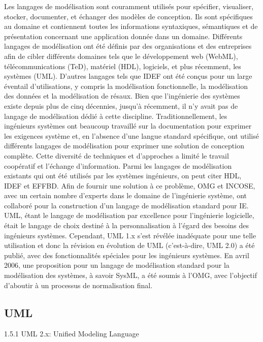 \documentclass[french]{spimufcphdthesis}
\begin{document}
Les langages de modélisation sont couramment utilisés pour spécifier, visualiser, stocker, documenter, et échanger des modèles de conception. Ils sont spécifiques au domaine et contiennent toutes les informations syntaxiques, sémantiques et de présentation concernant une application donnée dans un domaine. Différents langages de modélisation ont été définis par des organisations et des entreprises afin de cibler différents domaines tels que le développement web (WebML), télécommunications (TeD), matériel (HDL), logiciels, et plus récemment, les systèmes (UML). D'autres langages tels que IDEF ont été conçus pour un large éventail d'utilisations, y compris la modélisation fonctionnelle, la modélisation des données et la modélisation de résaux.
Bien que l’ingénierie des systèmes existe depuis plus de cinq décennies, jusqu'à récemment, il n'y avait pas de langage de modélisation dédié à cette discipline. Traditionnellement, les ingénieurs systèmes ont beaucoup travaillé sur la documentation pour exprimer les exigences système et, en l'absence d'une langue standard spécifique, ont utilisé différents langages de modélisation pour exprimer une solution de conception complète.
Cette diversité de techniques et d'approches a limité le travail coopératif et l'échange d’information. Parmi les langages de modélisation existants qui ont été utilisés par les systèmes ingénieurs, on peut citer HDL, IDEF et EFFBD. Afin de fournir une solution à ce problème, OMG et INCOSE, avec un certain nombre d'experts dans le domaine de l’ingénierie système, ont collaboré pour la construction d'un langage de modélisation standard pour IE.
UML, étant le langage de modélisation par excellence pour l'ingénierie logicielle, était le langage de choix destiné à la personnalisation à l'égard des besoins des ingénieurs systèmes. Cependant, UML 1.x s'est révélée inadéquate pour une telle utilisation et donc la révision en évolution de UML (c'est-à-dire, UML 2.0) a été publié, avec des fonctionnalités spéciales pour les ingénieurs systèmes. En avril 2006, une proposition pour un langage de modélisation standard pour la modélisation des systèmes, à savoir SysML, a été soumis à l'OMG, avec l'objectif d'aboutir à un processus de normalisation final.

\subsection{UML}
1.5.1 UML 2.x: Unified Modeling Language
\end{document}
